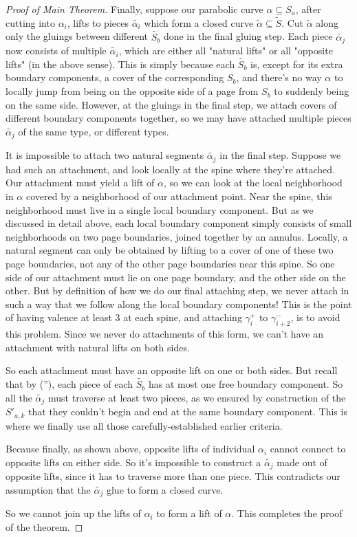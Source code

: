 \documentclass[12pt]{amsart}
\theoremstyle{definition}
\theoremstyle{remark}
\newcommand{\cin}{\subseteq}
\begin{document}
\begin{proof}[Proof of Main Theorem]
Finally, suppose our parabolic curve $\alpha \cin S_a$, after cutting into
$\alpha_i$, lifts to pieces $\widetilde{\alpha_i}$ which form a closed curve $\widetilde{\alpha}
\cin \widetilde{S}$.  Cut $\widetilde{\alpha}$ along only the gluings between different
$\widetilde{S_b}$ done in the final gluing step. Each piece $\widetilde{\alpha_j}$ now consists
of multiple $\widetilde{\alpha_i}$, which are either all "natural lifts" or all
"opposite lifts" (in the above sense). This is simply because each $\widetilde{S_b}$
is, except for its extra boundary components, a cover of the corresponding
$S_b$, and there's no way $\alpha$ to locally jump from being on the opposite
side of a page from $S_b$ to suddenly being on the same side. However, at the
gluings in the final step, we attach covers of different boundary components
together, so we may have attached multiple pieces $\widetilde{\alpha_j}$ of the same
type, or different types.

It is impossible to attach two natural segments $\widetilde{\alpha_j}$ in the final
step.  Suppose we had such an attachment, and look locally at the spine where
they're attached. Our attachment must yield a lift of $\alpha$, so we can look
at the local neighborhood in $\alpha$ covered by a neighborhood of our
attachment point.  Near the spine, this neighborhood must live in a single
local boundary component. But as we discussed in detail above, each local
boundary component simply consists of small neighborhoods on two page
boundaries, joined together by an annulus. Locally, a natural segment can only
be obtained by lifting to a cover of one of these two page boundaries, not any
of the other page boundaries near this spine. So one side of our attachment
must lie on one page boundary, and the other side on the other. But by
definition of how we do our final attaching step, we never attach in such a way
that we follow along the local boundary components! This is the point of having
valence at least 3 at each spine, and attaching $\gamma_i^+$ to
$\gamma_{i+2}^-$, is to avoid this problem. Since we never do attachments of
this form, we can't have an attachment with natural lifts on both sides.

So each attachment must have an opposite lift on one or both sides. But recall
that by (\dag''), each piece of each $\widetilde{S_b}$ has at most one free boundary
component. So all the $\widetilde{\alpha_j}$ must traverse at least two pieces, as we
ensured by construction of the $S'_{a,k}$ that they couldn't begin and end at the
same boundary component. This is where we finally use all those
carefully-established earlier criteria.

Because finally, as shown above, opposite lifts of individual $\alpha_i$ cannot
connect to opposite lifts on either side. So it's impossible to construct
a $\widetilde{\alpha_j}$ made out of opposite lifts, since it has to traverse
more than one piece.  This contradicts our assumption that the
$\widetilde{\alpha_j}$ glue to form a closed curve.

So we cannot join up the lifts of $\alpha_i$ to form a lift of $\alpha$. This
completes the proof of the theorem.

\end{proof}
\end{document}
